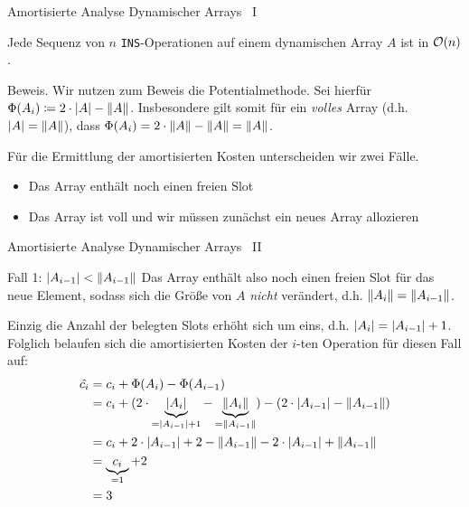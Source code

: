 \begin{frame}{Amortisierte Analyse Dynamischer Arrays \, I}
\begin{theorem}
Jede Sequenz von $n$ \texttt{INS}-Operationen auf einem dynamischen Array $A$ ist in $\mathcal{O}(n)$.
\end{theorem}
\begin{block}{Beweis.}
Wir nutzen zum Beweis die Potentialmethode.
Sei hierf\"ur $\Phi(A_i) \coloneqq 2 \cdot \vert A\vert - \lVert A\rVert$.
Insbesondere gilt somit f\"ur ein \emph{volles} Array (d.h. $\vert A\vert = \lVert A\rVert$), dass $\Phi(A_i) = 2 \cdot \lVert A\rVert - \lVert A\rVert = \lVert A\rVert$.

F\"ur die Ermittlung der amortisierten Kosten unterscheiden wir zwei F\"alle.
\begin{itemize}
    \item Das Array enth\"alt noch einen freien Slot
    \item Das Array ist voll und wir m\"ussen zun\"achst ein neues Array allozieren
\end{itemize}
\end{block}
\end{frame}

\begin{frame}{Amortisierte Analyse Dynamischer Arrays \, II}
\begin{block}{Fall 1: $\vert A_{i-1}\vert < \lVert A_{i-1}\rVert$}
Das Array enth\"alt also noch einen freien Slot f\"ur das neue Element, sodass sich die Gr\"o{\ss}e von $A$ \emph{nicht} ver\"andert, d.h. $\lVert A_i\rVert = \lVert A_{i-1}\rVert$.

Einzig die Anzahl der belegten Slots erh\"oht sich um eins, d.h. $\vert A_i\vert = \vert A_{i-1}\vert + 1$.
Folglich belaufen sich die amortisierten Kosten der $i$-ten Operation f\"ur diesen Fall auf:
\begin{align*}
    \hat{c_i} &= c_i + \Phi(A_i) - \Phi(A_{i-1}) \\
    &= c_i + (2 \cdot \underbrace{\vert A_i\vert}_{= \vert A_{i-1}\vert + 1} - \underbrace{\lVert A_i\rVert}_{=\lVert A_{i-1}\rVert}) - (2 \cdot \vert A_{i-1}\vert - \lVert A_{i-1}\rVert) \\
    &= c_i + 2 \cdot \vert A_{i-1}\vert + 2 - \lVert A_{i-1}\rVert - 2 \cdot \vert A_{i-1}\vert + \lVert A_{i-1}\rVert \\
    &= \underbrace{c_i}_{=1} + 2 \\
    &= 3
\end{align*}
\end{block}
\end{frame}

